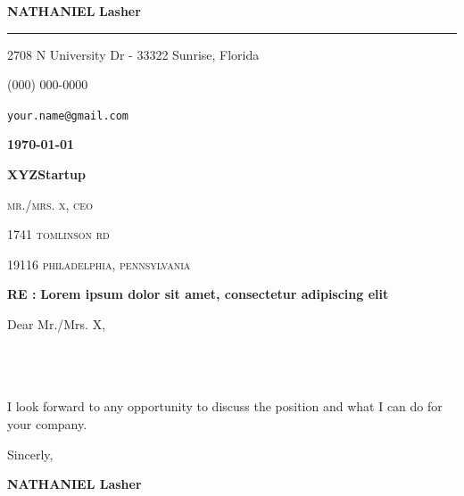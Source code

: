 \documentclass[12pt]{article}
\newcommand{\firstname}{Lasher}
\newcommand{\lastname}{Nathaniel}
\newcommand{\mainColor}{redBlood} %
\newlength{\spacebox}
\newcommand{\shspace}{\hspace*{0.8em}}
\newcommand{\xvspace}{\vspace*{0.1em}}
\newcommand{\svspace}{\vspace*{0.5em}}
\newcommand{\mvspace}{\vspace*{1.5em}}
\newcommand{\hvspace}{\vspace*{2.5em}}
\newcommand{\negmvspace}{\vspace*{-1em}}
\newcommand{\userInfo}[4]{
    \begin{flushleft}
        \color{\mainColor}
        \Huge
        \textbf{\MakeUppercase{\lastname}}
        \color{black}
        \textbf{\firstname}
        \color{\mainColor}
        \noindent\rule{19.1cm}{0.8pt}
        \color{grayShy}
        \small
        \par
        \parbox{7\spacebox} {
            \faMap \shspace #1 - #2 \par \svspace
            \faPhone \shspace #3 \par \svspace
            \faEnvelopeOpen \shspace \texttt{#4} \par \svspace
        }
        \color{\mainColor}
        \mvspace
    \end{flushleft}
    \negmvspace
}
\newcommand{\companyInfo}[4]{
    \begin{flushright}
        \parbox{4\spacebox}{
            \raggedleft
            \small
            \textbf{\today}\par
            \xvspace
            \textbf{#1}\par
            \mvspace
            \color{grayShy} \textsc{\MakeLowercase{#2}}\par
            \xvspace
            \textsc{\MakeLowercase{#3}}\par
            \xvspace
            \textsc{\MakeLowercase{#4}}\par 
            \color{black}
        }
    \end{flushright} 
    \hvspace
}
\newcommand{\object}[1]{
    \small
    \color{\mainColor} \textbf{RE :} \color{black} \textbf{#1} \par
}
\newcommand{\content}[2]{
    \mvspace
    \begin{flushleft}
        \parbox{10.3\spacebox}{
          #1\par
          \svspace
          #2
        }\par
    \end{flushleft}
}
\newcommand{\signature}{
    \svspace
    \parbox{3\spacebox}{
      Sincerly,\par
      \svspace \hspace{-0.3em}
      \textbf{\color{\mainColor} \MakeUppercase{\lastname} \color{black} \firstname}\par
      \svspace \svspace
      \Huge \faPenNib\par
    }\par
}
\begin{document}
\selectfont
\userInfo{2708 N University Dr}{33322 Sunrise, Florida}{(000) 000-0000}{your.name@gmail.com}
\companyInfo{XYZStartup}{Mr./Mrs. X, CEO}{1741 Tomlinson RD}{19116 Philadelphia, Pennsylvania}
\object{Lorem ipsum dolor sit amet, consectetur adipiscing elit}
\content{
	Dear Mr./Mrs. X, \\

	\lipsum[1-1] \\

	\lipsum[3-3] \\

	\lipsum[5-5] \\
}{I look forward to any opportunity to discuss the position and what I can do for your company.}
\signature
\end{document}
